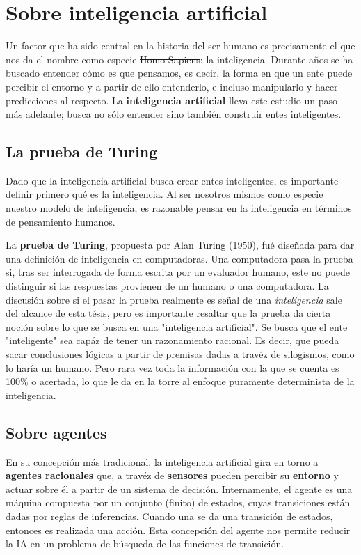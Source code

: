 \section{Sobre inteligencia artificial}
Un factor que ha sido central en la historia del ser humano es
precisamente el que nos da el nombre como especie \sout{Homo Sapiens}:
la inteligencia. Durante años se ha buscado entender cómo es que pensamos,
es decir, la forma en que un ente puede percibir el entorno y a partir
de ello entenderlo, e incluso manipularlo y hacer predicciones al respecto.
La \textbf{inteligencia artificial} lleva este estudio un paso más adelante;
busca no sólo entender sino también construir entes inteligentes.

\subsection{La prueba de Turing}
Dado que la inteligencia artificial busca crear entes inteligentes,
es importante definir primero qué es la inteligencia. Al ser nosotros
mismos como especie nuestro modelo de inteligencia, es razonable pensar
en la inteligencia en términos de pensamiento humanos.

La \textbf{prueba de Turing}, propuesta por Alan Turing (1950), fué diseñada
para dar una definición de inteligencia en computadoras. Una computadora pasa
la prueba si, tras ser interrogada de forma escrita por un evaluador humano,
este no puede distinguir si las respuestas provienen de un humano o una computadora.
La discusión sobre si el pasar la prueba realmente es señal de una \textit{inteligencia}
sale del alcance de esta tésis, pero es importante resaltar que la prueba da
cierta noción sobre lo que se busca en una "inteligencia artificial".
Se busca que el ente "inteligente" sea capáz de tener un razonamiento racional.
Es decir, que pueda sacar conclusiones lógicas a partir de premisas dadas a travéz
de silogismos, como lo haría un humano. Pero rara vez toda la información con la que
se cuenta es 100\% o acertada, lo que le da en la torre al enfoque puramente
determinista de la inteligencia. 

\subsection{Sobre agentes}
En su concepción más tradicional, la inteligencia artificial gira en torno a
\textbf{agentes racionales} que, a travéz de \textbf{sensores} pueden percibir
su \textbf{entorno} y actuar sobre él a partir de un sistema de decisión.
Internamente, el agente es una máquina compuesta por un conjunto (finito) de estados,
cuyas transiciones están dadas por reglas de inferencias. Cuando una se da una
transición de estados, entonces es realizada una acción. Esta concepción del agente
nos permite reducir la IA en un problema de búsqueda de las funciones de transición.

